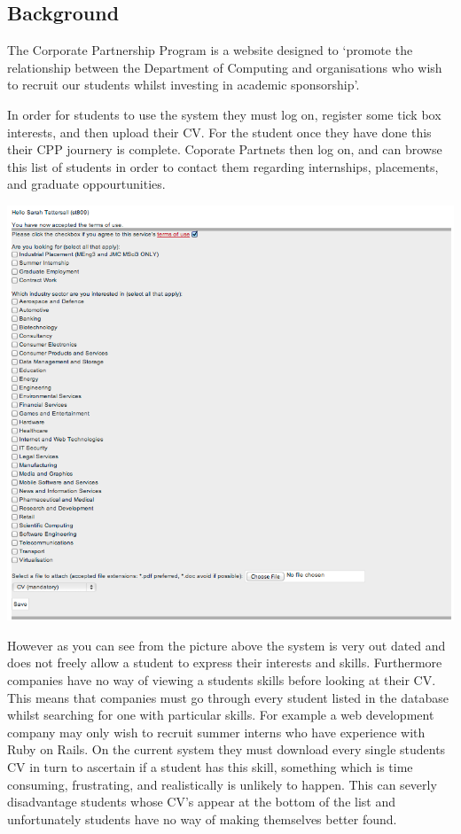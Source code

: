 \subsection{Background}
The Corporate Partnership Program is a website designed to `promote the relationship between the Department of Computing and organisations who wish to recruit our students whilst investing in academic sponsorship'\cite{doc-cpp}.

In order for students to use the system they must log on, register some tick box interests, and then upload their CV.
For the student once they have done this their CPP journery is complete.
Coporate Partnets then log on, and can browse this list of students in order to contact them regarding internships, placements, and graduate oppourtunities.

\includegraphics[scale=0.5]{images/introduction/old_cpp}

However as you can see from the picture above the system is very out dated and does not freely allow a student to express their interests and skills. Furthermore companies have no way of viewing a students skills before looking at their CV. This means that companies must go through every student listed in the database whilst searching for one with particular skills. For example a web development company may only wish to recruit summer interns who have experience with Ruby on Rails. On the current system they must download every single students CV in turn to ascertain if a student has this skill, something which is time consuming, frustrating, and realistically is unlikely to happen.
This can severly disadvantage students whose CV's appear at the bottom of the list and unfortunately students have
no way of making themselves better found.

